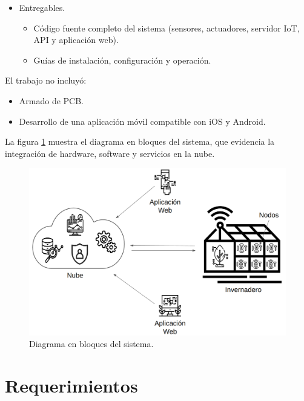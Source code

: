 \begin{itemize}
      \item Entregables.
            \begin{itemize}
                  \item Código fuente completo del sistema (sensores, actuadores, servidor IoT, API y
                        aplicación web).
                  \item Guías de instalación, configuración y operación.
            \end{itemize}
\end{itemize}

El trabajo no incluyó:
\begin{itemize}
      \item Armado de PCB.
      \item Desarrollo de una aplicación móvil compatible con iOS y Android.
\end{itemize}

\hspace{1cm}

La figura \ref{fig:diagBloques} muestra el diagrama en bloques del sistema, que
evidencia la integración de hardware, software y servicios en la nube.

\begin{figure}[htpb]
      \centering
      \includegraphics[width=.85\textwidth]{./Images/1.png}
      \caption{Diagrama en bloques del sistema.}
      \label{fig:diagBloques}
\end{figure}


\section{Requerimientos}

